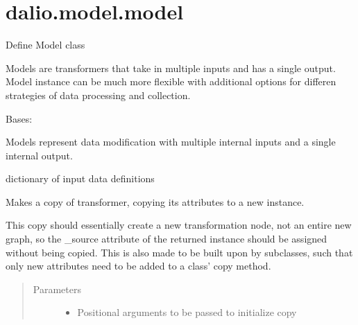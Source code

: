 \documentclass[letterpaper,10pt,english]{sphinxmanual}
\begin{document}
\section{dalio.model.model}
\label{\detokenize{dalio.model:module-dalio.model.model}}\label{\detokenize{dalio.model:dalio-model-model}}
Define Model class

Models are transformers that take in multiple inputs and has a single output.
Model instance can be much more flexible with additional options for differen
strategies of data processing and collection.

\begin{fulllineitems}
\label{\detokenize{dalio.model:dalio.model.model.Model}}
Bases: 

Models represent data modification with multiple internal inputs and a
single internal output.

\begin{fulllineitems}
\label{\detokenize{dalio.model:dalio.model.model.Model._source}}
dictionary of input data definitions

\end{fulllineitems}


\begin{fulllineitems}
\label{\detokenize{dalio.model:dalio.model.model.Model.copy}}
Makes a copy of transformer, copying its attributes to a new
instance.

This copy should essentially create a new transformation node, not an
entire new graph, so the \_source attribute of the returned instance
should be assigned without being copied. This is also made to be built
upon by subclasses, such that only new attributes need to be added to
a class’ copy method.
\begin{quote}\begin{description}
\item[{Parameters}] \leavevmode\begin{itemize}
\item {} 
 \textendash{} Positional arguments to be passed to initialize copy


\end{itemize}
\end{description}
\end{quote}
\end{fulllineitems}
\end{fulllineitems}
\end{document}
